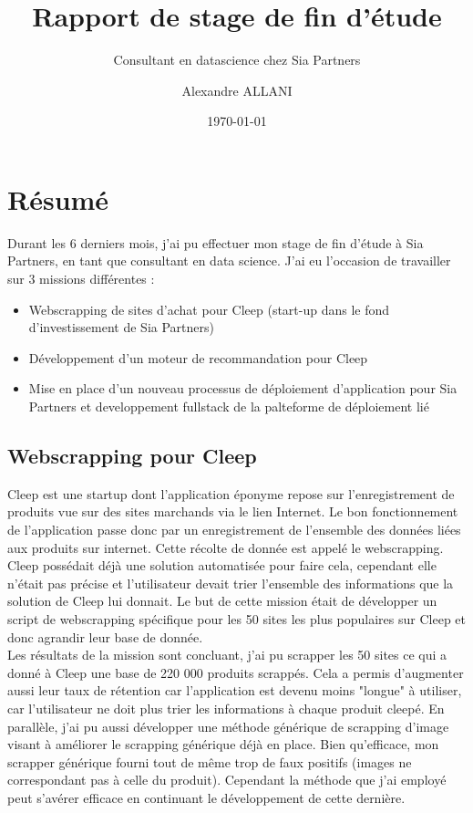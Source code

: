 \documentclass{article} %
\author{Alexandre ALLANI}
\date{\noexpand\today} %
\title{Rapport de stage de fin d'étude}
\subtitle{Consultant en datascience chez Sia Partners}
\begin{document}
\section{Résumé}

Durant les 6 derniers mois, j'ai pu effectuer mon stage de fin d'étude à Sia Partners, en tant que consultant en data science. J'ai eu l'occasion de travailler sur 3 missions différentes :
\begin{itemize}
	\item Webscrapping de sites d'achat pour Cleep (start-up dans le fond d'investissement de Sia Partners)
	\item Développement d'un moteur de recommandation pour Cleep 
	\item Mise en place d'un nouveau processus de déploiement d'application pour Sia Partners et developpement fullstack de la palteforme de déploiement lié
\end{itemize}

\subsection{Webscrapping pour Cleep}
Cleep est une startup dont l'application éponyme repose sur l'enregistrement de produits vue sur des sites marchands via le lien Internet. Le bon fonctionnement de l'application passe donc par un enregistrement de l'ensemble des données liées aux produits sur internet. Cette récolte de donnée est appelé le webscrapping.\\

Cleep possédait déjà une solution automatisée pour faire cela, cependant elle n'était pas précise et l'utilisateur devait trier l'ensemble des informations que la solution de Cleep lui donnait. Le but de cette mission était de développer un script de webscrapping spécifique pour les 50 sites les plus populaires sur Cleep et donc agrandir leur base de donnée.\\

Les résultats de la mission sont concluant, j'ai pu scrapper les 50 sites ce qui a donné à Cleep une base de 220 000 produits scrappés. Cela a permis d'augmenter aussi leur taux de rétention car l'application est devenu moins "longue" à utiliser, car l'utilisateur ne doit plus trier les informations à chaque produit cleepé. En parallèle, j'ai pu aussi développer une méthode générique de scrapping d'image visant à améliorer le scrapping générique déjà en place. Bien qu'efficace, mon scrapper générique fourni tout de même trop de faux positifs (images ne correspondant pas à celle du produit). Cependant la méthode que j'ai employé peut s'avérer efficace en continuant le développement de cette dernière.
\end{document}
